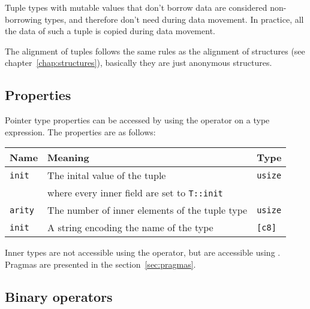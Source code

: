 Tuple types with mutable values that don't borrow data are considered
non-borrowing types, and therefore don't need  during data
movement. In practice, all the data of such a tuple is copied during data
movement.

The alignment of tuples follows the same rules as the alignment of structures
(see chapter~\ref{chap:structures}), basically they are just anonymous
structures.

\subsection {Properties}

Pointer type properties can be accessed by using the \token{::} operator on a
type expression. The properties are as follows:
\smallskip

\begin{center}
  \begin{adjustbox}{max width=\linewidth}
    \begin{tabular}{|l|ll|}
      \hline
      Name & Meaning & Type\\
      \hline
      \hline
      \texttt{init} & The inital value of the tuple & \texttt{usize} \\
      & where every inner field are set to \texttt{T::init} & \\
      \Xhline{0.001pt}
      \texttt{arity} & The number of inner elements of the tuple type & \texttt{usize}\\
      \hline
      \texttt{init} & A string encoding the name of the type & \texttt{[c8]} \\
      \hline
    \end{tabular}
  \end{adjustbox}
\end{center}

\smallskip

Inner types are not accessible using the \token{::} operator, but are
accessible using . Pragmas are presented in the
section~\ref{sec:pragmas}.

\subsection {Binary operators}

